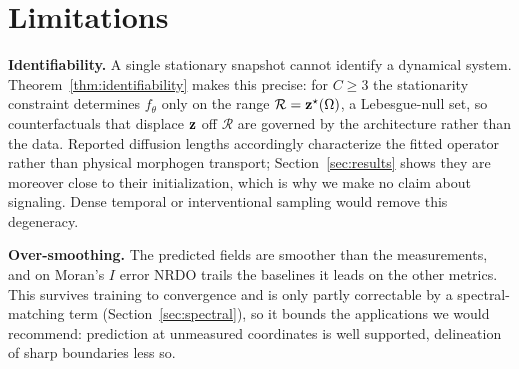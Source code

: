 \section{Limitations}
\label{sec:limitations}

\textbf{Identifiability.} A single stationary snapshot cannot identify a
dynamical system. Theorem~\ref{thm:identifiability} makes this precise: for
$C\ge3$ the stationarity constraint determines $f_\theta$ only on the range
$\mathcal{R}=\mathbf{z}^\star(\Omega)$, a Lebesgue-null set, so counterfactuals that
displace $\mathbf{z}$ off $\mathcal{R}$ are governed by the architecture rather than the
data. Reported diffusion lengths accordingly characterize the fitted operator
rather than physical morphogen transport; Section~\ref{sec:results} shows they
are moreover close to their initialization, which is why we make no claim about
signaling. Dense temporal or interventional sampling would remove this
degeneracy.

\textbf{Over-smoothing.} The predicted fields are smoother than the measurements,
and on Moran's $I$ error NRDO trails the baselines it leads on the other metrics.
This survives training to convergence and is only partly correctable by a
spectral-matching term (Section~\ref{sec:spectral}), so it bounds the
applications we would recommend: prediction at unmeasured coordinates is well
supported, delineation of sharp boundaries less so.


